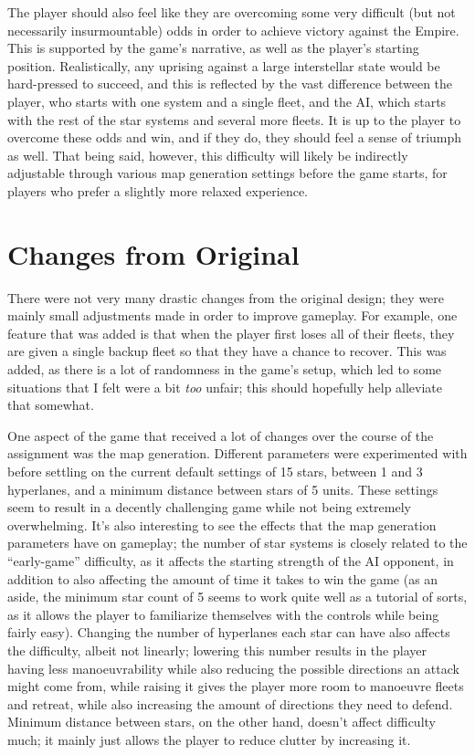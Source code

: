 \documentclass[10pt]{article}
\begin{document}
The player should also feel like they are overcoming some very difficult (but not necessarily insurmountable) odds in order to
achieve victory against the Empire. This is supported by the game's narrative, as well as the player's starting position.
Realistically, any uprising against a large interstellar state would be hard-pressed to succeed, and this is reflected by
the vast difference between the player, who starts with one system and a single fleet, and the AI, which starts with the rest of
the star systems and several more fleets. It is up to the player to overcome these odds and win, and if they do, they should
feel a sense of triumph as well. That being said, however, this difficulty will likely be indirectly adjustable through various
map generation settings before the game starts, for players who prefer a slightly more relaxed experience.

\section{Changes from Original}

There were not very many drastic changes from the original design; they were mainly small adjustments made in order to improve gameplay.
For example, one feature that was added is that when the player first loses all of their fleets, they are given a single backup fleet so
that they have a chance to recover. This was added, as there is a lot of randomness in the game's setup, which led to some situations
that I felt were a bit \textit{too} unfair; this should hopefully help alleviate that somewhat.

One aspect of the game that received a lot of changes over the course of the assignment was the map generation. Different parameters
were experimented with before settling on the current default settings of 15 stars, between 1 and 3 hyperlanes, and a minimum distance
between stars of 5 units. These settings seem to result in a decently challenging game while not being extremely overwhelming.
It's also interesting to see the effects that the map generation parameters have on gameplay; the number of star systems is closely related
to the ``early-game'' difficulty, as it affects the starting strength of the AI opponent, in addition to also affecting the amount of time it takes
to win the game (as an aside, the minimum star count of 5 seems to work quite well as a tutorial of sorts, as it allows the player to familiarize themselves
with the controls while being fairly easy). Changing the number of hyperlanes each star can have also affects the difficulty, albeit not linearly;
lowering this number results in the player having less manoeuvrability while also reducing the possible directions an attack might come from,
while raising it gives the player more room to manoeuvre fleets and retreat, while also increasing the amount of directions they need to defend.
Minimum distance between stars, on the other hand, doesn't affect difficulty much; it mainly just allows the player to reduce clutter
by increasing it.
\end{document}
